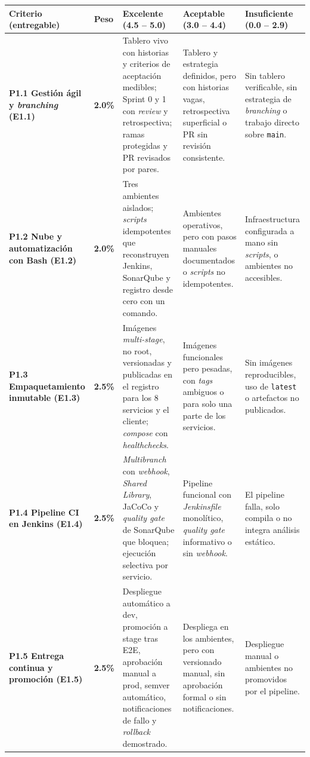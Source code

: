 \documentclass[10pt,letterpaper]{article}
\renewcommand{\arraystretch}{1.25}
\begin{document}
\setlength{\tabcolsep}{3.5pt}
\fontsize{7.5}{9.5}\selectfont
\renewcommand{\arraystretch}{1.15}
\begin{longtable}{|L{2.7cm}|C{0.9cm}|L{4.35cm}|L{4.35cm}|L{4.35cm}|}
\hline
{}
\textbf{Criterio (entregable)} & \textbf{Peso} & \textbf{Excelente (4.5 -- 5.0)} & \textbf{Aceptable (3.0 -- 4.4)} & \textbf{Insuficiente (0.0 -- 2.9)} \\ \hline
\endhead
\textbf{P1.1 Gestión ágil y \textit{branching} (E1.1)} & \textbf{2.0\%} & Tablero vivo con historias y criterios de aceptación medibles; Sprint 0 y 1 con \textit{review} y retrospectiva; ramas protegidas y PR revisados por pares. & Tablero y estrategia definidos, pero con historias vagas, retrospectiva superficial o PR sin revisión consistente. & Sin tablero verificable, sin estrategia de \textit{branching} o trabajo directo sobre \texttt{main}. \\ \hline
\textbf{P1.2 Nube y automatización con Bash (E1.2)} & \textbf{2.0\%} & Tres ambientes aislados; \textit{scripts} idempotentes que reconstruyen Jenkins, SonarQube y registro desde cero con un comando. & Ambientes operativos, pero con pasos manuales documentados o \textit{scripts} no idempotentes. & Infraestructura configurada a mano sin \textit{scripts}, o ambientes no accesibles. \\ \hline
\textbf{P1.3 Empaquetamiento inmutable (E1.3)} & \textbf{2.5\%} & Imágenes \textit{multi-stage}, no root, versionadas y publicadas en el registro para los 8 servicios y el cliente; \textit{compose} con \textit{healthchecks}. & Imágenes funcionales pero pesadas, con \textit{tags} ambiguos o para solo una parte de los servicios. & Sin imágenes reproducibles, uso de \texttt{latest} o artefactos no publicados. \\ \hline
\textbf{P1.4 Pipeline CI en Jenkins (E1.4)} & \textbf{2.5\%} & \textit{Multibranch} con \textit{webhook}, \textit{Shared Library}, JaCoCo y \textit{quality gate} de SonarQube que bloquea; ejecución selectiva por servicio. & Pipeline funcional con \textit{Jenkinsfile} monolítico, \textit{quality gate} informativo o sin \textit{webhook}. & El pipeline falla, solo compila o no integra análisis estático. \\ \hline
\textbf{P1.5 Entrega continua y promoción (E1.5)} & \textbf{2.5\%} & Despliegue automático a dev, promoción a stage tras E2E, aprobación manual a prod, semver automático, notificaciones de fallo y \textit{rollback} demostrado. & Despliega en los ambientes, pero con versionado manual, sin aprobación formal o sin notificaciones. & Despliegue manual o ambientes no promovidos por el pipeline. \\ \hline

\end{longtable}
\end{document}
